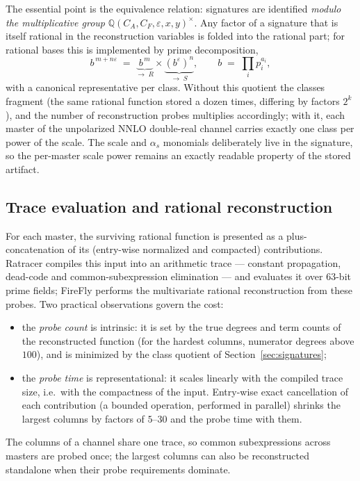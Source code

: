 \documentclass[11pt]{article}
\newcommand{\eps}{\varepsilon}
\newcommand{\CA}{C_A}
\newcommand{\CF}{C_F}
\newcommand{\as}{\alpha_s}
\begin{document}
The essential point is the equivalence relation: signatures are
identified \emph{modulo the multiplicative group}
$\mathbb{Q}(\CA,\CF,\eps,x,y)^\times$.  Any factor of a signature that
is itself rational in the reconstruction variables is folded into the
rational part; for rational bases this is implemented by prime
decomposition,
\begin{equation}
  b^{\,m+n\eps} \;=\;
  \underbrace{\;b^{\,m}\;}_{\to\;R}
  \times
  \underbrace{\left(b^{\eps}\right)^{n}}_{\to\;S},
  \qquad
  b \;=\; \textstyle\prod_i p_i^{a_i},
\end{equation}
with a canonical representative per class.  Without this quotient the
classes fragment (the same rational function stored a dozen times,
differing by factors $2^k$), and the number of reconstruction probes
multiplies accordingly; with it, each master of the unpolarized NNLO
double-real channel carries exactly one class per power of the scale.
The scale and $\as$ monomials deliberately live in the signature, so
the per-master scale power remains an exactly readable property of the
stored artifact.

\subsection{Trace evaluation and rational reconstruction}

For each master, the surviving rational function is presented as a
plus-concatenation of its (entry-wise normalized and compacted)
contributions.  \textsf{Ratracer} compiles this input into an
arithmetic trace --- constant propagation, dead-code and
common-subexpression elimination --- and evaluates it over $63$-bit
prime fields; \textsf{FireFly} performs the multivariate rational
reconstruction from these probes.  Two practical observations govern
the cost:
\begin{itemize}
\item the \emph{probe count} is intrinsic: it is set by the true
  degrees and term counts of the reconstructed function (for the
  hardest columns, numerator degrees above $100$), and is minimized by
  the class quotient of Section~\ref{sec:signatures};
\item the \emph{probe time} is representational: it scales linearly
  with the compiled trace size, i.e.\ with the compactness of the
  input.  Entry-wise exact cancellation of each contribution (a
  bounded operation, performed in parallel) shrinks the largest
  columns by factors of $5$--$30$ and the probe time with them.
\end{itemize}
The columns of a channel share one trace, so common subexpressions
across masters are probed once; the largest columns can also be
reconstructed standalone when their probe requirements dominate.
\end{document}
